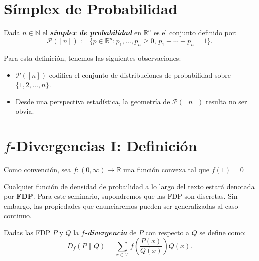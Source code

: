 \section{S\'implex de Probabilidad}

\begin{definition}\cite{differentialpriv}
Dada $n\in\mathbb{N}$ el \textbf{\textit{s\'implex de probabilidad}} en $\mathbb{R}^n$ es el conjunto definido por:
\begin{equation}\label{eq:Simplex}
    \mathcal{P}([n]):=\{p\in\mathbb{R}^n\colon p_1,\dots,p_n\geq0,\,p_1+\cdots+p_n=1\}.
\end{equation}
\end{definition}

Para esta definici\'on, tenemos las siguientes observaciones:
\begin{itemize}
    \item $\mathcal{P}([n])$ codifica el conjunto de distribuciones de probabilidad sobre $\{1,2,\dots,n\}$. 
    \item Desde una perspectiva estad\'istica, la geometr\'ia de $\mathcal{P}([n])$ resulta no ser obvia. 
\end{itemize}

\section{$f$-Divergencias I: Definici\'on}

\begin{notation} Como convenci\'on, sea $f\colon(0,\infty)\to\mathbb{R}$ una funci\'on convexa tal que $f(1)=0$
\end{notation}
\begin{notation}
    Cualquier funci\'on de densidad de probailidad a lo largo del texto estar\'a denotada por \textbf{FDP}. Para este seminario, supondremos que las FDP son discretas. Sin embargo, las propiedades que enunciaremos pueden ser generalizadas al caso continuo. 
\end{notation}

\begin{definition}\cite{1571417125811646464}
    Dadas las FDP $P$ y $Q$ la \textbf{\textit{$f$-divergencia}} de $P$ con respecto a $Q$ se define como:
    \begin{equation}\label{eq:fDivergencia}
        D_f(P\|Q)=\sum_{x\in\mathcal{X}}f\left(\frac{P(x)}{Q(x)}\right)Q(x).
    \end{equation}
\end{definition}

